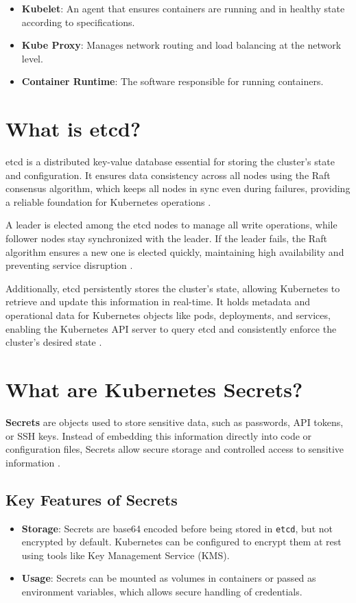 \documentclass[a4paper,11pt,openright,BCOR=15mm]{scrbook}
\begin{document}
\begin{itemize}
	\item \textbf{Kubelet}: An agent that ensures containers are running and in healthy state according to specifications.
	\item \textbf{Kube Proxy}: Manages network routing and load balancing at the network level.
	\item \textbf{Container Runtime}: The software responsible for running containers.
\end{itemize}

\section{What is etcd?}

etcd is a distributed key-value database essential for storing the cluster’s state and configuration. It ensures data consistency across all nodes using the Raft consensus algorithm, which keeps all nodes in sync even during failures, providing a reliable foundation for Kubernetes operations \cite{etcd_faq_2024}.

A leader is elected among the etcd nodes to manage all write operations, while follower nodes stay synchronized with the leader. If the leader fails, the Raft algorithm ensures a new one is elected quickly, maintaining high availability and preventing service disruption \cite{etcd_faq_2024}.

Additionally, etcd persistently stores the cluster's state, allowing Kubernetes to retrieve and update this information in real-time. It holds metadata and operational data for Kubernetes objects like pods, deployments, and services, enabling the Kubernetes API server to query etcd and consistently enforce the cluster’s desired state \cite{etcd_faq_2024}.

\section{What are Kubernetes Secrets?}

\textbf{Secrets} are objects used to store sensitive data, such as passwords, API tokens, or SSH keys. Instead of embedding this information directly into code or configuration files, Secrets allow secure storage and controlled access to sensitive information \cite{the_linux_foundation_secrets_2024}.

\subsection{Key Features of Secrets}
\begin{itemize}
	\item \textbf{Storage}: Secrets are base64 encoded before being stored in \texttt{etcd}, but not encrypted by default. Kubernetes can be configured to encrypt them at rest using tools like Key Management Service (KMS).
	\item \textbf{Usage}: Secrets can be mounted as volumes in containers or passed as environment variables, which allows secure handling of credentials.
\end{itemize}
		
\end{document}

